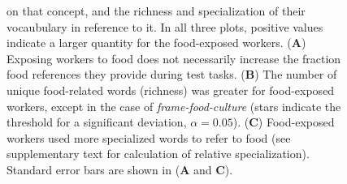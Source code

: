 \documentclass{sigchi}
\begin{document}
\begin{figure}
{		on that concept, and the richness and specialization of their 
		vocaubulary in reference to it.
		In all three plots, positive values indicate a larger quantity for 
		the food-exposed workers.
		(\textbf{A}) Exposing workers to food does not necessarily increase
		the fraction food references they provide during test tasks.
		(\textbf{B}) The number of unique food-related
		words (richness) was greater for food-exposed workers, except in the 
		case of \textit{frame-food-culture} (stars indicate the threshold
		for a significant deviation, $\alpha=0.05$). 
		(\textbf{C}) Food-exposed
		workers used more specialized words to refer to food (see 
		supplementary text for calculation of relative specialization).
		Standard error bars are shown in (\textbf{A} and \textbf{C}).
	}
	\label{fig:specificity}
\end{figure}
\end{document}
